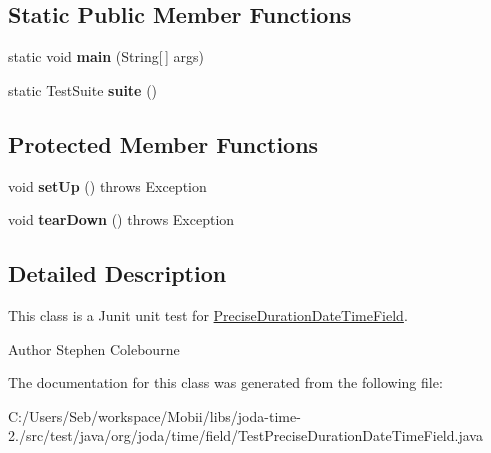 \subsection*{Static Public Member Functions}
\begin{DoxyCompactItemize}
\item 
\hypertarget{classorg_1_1joda_1_1time_1_1field_1_1_test_precise_duration_date_time_field_ac59779e7e43d8e78153523f5829ea828}{static void {\bfseries main} (String\mbox{[}$\,$\mbox{]} args)}\label{classorg_1_1joda_1_1time_1_1field_1_1_test_precise_duration_date_time_field_ac59779e7e43d8e78153523f5829ea828}

\item 
\hypertarget{classorg_1_1joda_1_1time_1_1field_1_1_test_precise_duration_date_time_field_a34343480bb0955c91e78b3fa5683f1b9}{static Test\-Suite {\bfseries suite} ()}\label{classorg_1_1joda_1_1time_1_1field_1_1_test_precise_duration_date_time_field_a34343480bb0955c91e78b3fa5683f1b9}

\end{DoxyCompactItemize}
\subsection*{Protected Member Functions}
\begin{DoxyCompactItemize}
\item 
\hypertarget{classorg_1_1joda_1_1time_1_1field_1_1_test_precise_duration_date_time_field_adbc6a285cbe35aa14484ed70316b325c}{void {\bfseries set\-Up} ()  throws Exception }\label{classorg_1_1joda_1_1time_1_1field_1_1_test_precise_duration_date_time_field_adbc6a285cbe35aa14484ed70316b325c}

\item 
\hypertarget{classorg_1_1joda_1_1time_1_1field_1_1_test_precise_duration_date_time_field_a95d13c90f33635875a58b6a2b75980cb}{void {\bfseries tear\-Down} ()  throws Exception }\label{classorg_1_1joda_1_1time_1_1field_1_1_test_precise_duration_date_time_field_a95d13c90f33635875a58b6a2b75980cb}

\end{DoxyCompactItemize}


\subsection{Detailed Description}
This class is a Junit unit test for \hyperlink{classorg_1_1joda_1_1time_1_1field_1_1_precise_duration_date_time_field}{Precise\-Duration\-Date\-Time\-Field}.

\begin{DoxyAuthor}{Author}
Stephen Colebourne 
\end{DoxyAuthor}


The documentation for this class was generated from the following file\-:\begin{DoxyCompactItemize}
\item 
C\-:/\-Users/\-Seb/workspace/\-Mobii/libs/joda-\/time-\/2./src/test/java/org/joda/time/field/Test\-Precise\-Duration\-Date\-Time\-Field.\-java\end{DoxyCompactItemize}
